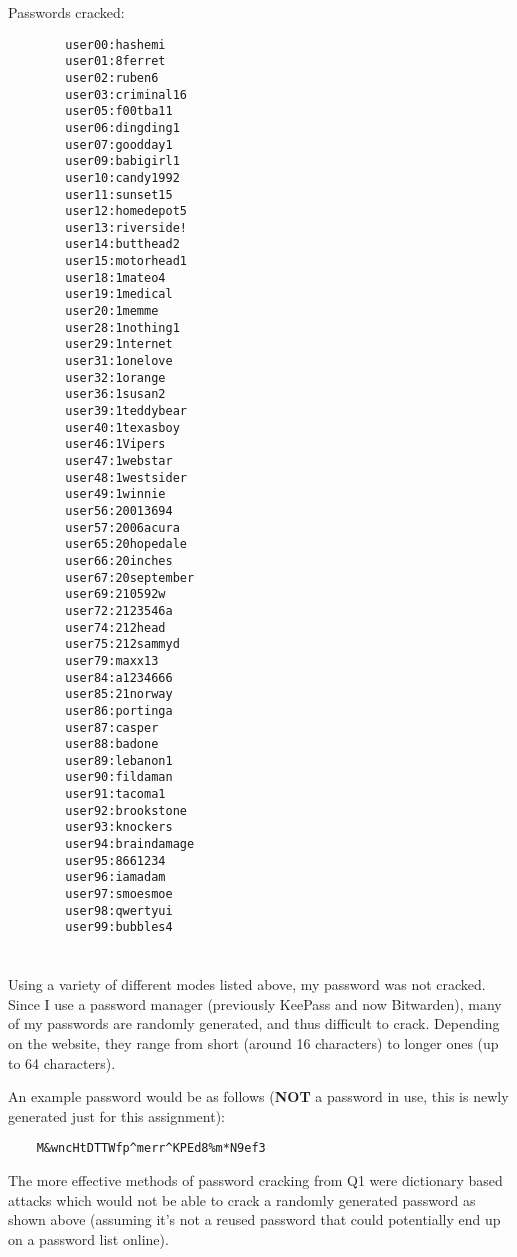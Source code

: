 \documentclass[12pt]{exam}
\begin{document}
\noindent
Passwords cracked:
\begin{multicols}{2}
    \begin{lstlisting}
        user00:hashemi
        user01:8ferret
        user02:ruben6
        user03:criminal16
        user05:f00tba11
        user06:dingding1
        user07:goodday1
        user09:babigirl1
        user10:candy1992
        user11:sunset15
        user12:homedepot5
        user13:riverside!
        user14:butthead2
        user15:motorhead1
        user18:1mateo4
        user19:1medical
        user20:1memme
        user28:1nothing1
        user29:1nternet
        user31:1onelove
        user32:1orange
        user36:1susan2
        user39:1teddybear
        user40:1texasboy
        user46:1Vipers
        user47:1webstar
        user48:1westsider
        user49:1winnie
        user56:20013694
        user57:2006acura
        user65:20hopedale
        user66:20inches
        user67:20september
        user69:210592w
        user72:2123546a
        user74:212head
        user75:212sammyd
        user79:maxx13
        user84:a1234666
        user85:21norway
        user86:portinga
        user87:casper
        user88:badone
        user89:lebanon1
        user90:fildaman
        user91:tacoma1
        user92:brookstone
        user93:knockers
        user94:braindamage
        user95:8661234
        user96:iamadam
        user97:smoesmoe
        user98:qwertyui
        user99:bubbles4
    \end{lstlisting}
\end{multicols}

\section{}

Using a variety of different modes listed above, my password was not cracked.
Since I use a password manager (previously KeePass and now Bitwarden), many of
my passwords are randomly generated, and thus difficult to crack.  Depending on
the website, they range from short (around 16 characters) to longer ones (up to
64 characters).

An example password would be as follows (\textbf{NOT} a password in use, this is newly
generated just for this assignment):

\begin{lstlisting}
    M&wncHtDTTWfp^merr^KPEd8%m*N9ef3
\end{lstlisting}

The more effective methods of password cracking from Q1 were dictionary based
attacks which would not be able to crack a randomly generated password as shown
above (assuming it’s not a reused password that could potentially end up on a
password list online).
\end{document}
